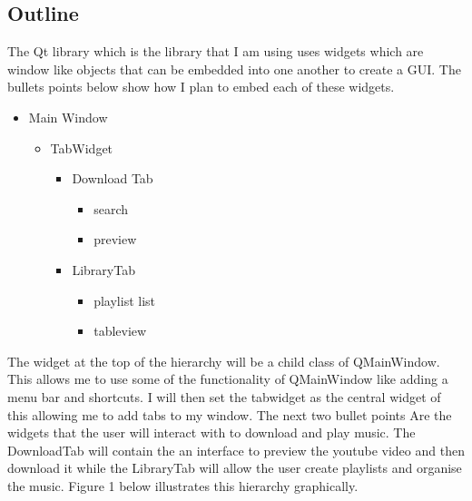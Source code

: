 \documentclass{article}
\begin{document}
\subsection{Outline}\label{outline}
The Qt library which is the library that I am using uses widgets which are window
like objects that can be embedded into one another to create a GUI. The bullets
points below show how I plan to embed each of these widgets.
\begin{itemize}
    \item Main Window
        \begin{itemize}
            \item TabWidget
                \begin{itemize}
                    \item Download Tab
                        \begin{itemize}
                            \item search
                            \item preview
                        \end{itemize}
                    \item LibraryTab
                        \begin{itemize}
                            \item playlist list
                            \item tableview
                        \end{itemize}
                \end{itemize}
        \end{itemize}
\end{itemize}
The widget at the top of the hierarchy will be a child class of QMainWindow. This
allows me to use some of the functionality of QMainWindow like adding a menu bar
and shortcuts. I will then set the tabwidget as the central widget of this
allowing me to add tabs to my window. The next two bullet points Are the widgets
that the user will interact with to download and play music. The DownloadTab will
contain the an interface to preview the youtube video and then download it while
the LibraryTab will allow the user create playlists and organise the music. Figure 1
below illustrates this hierarchy graphically.
\end{document}
